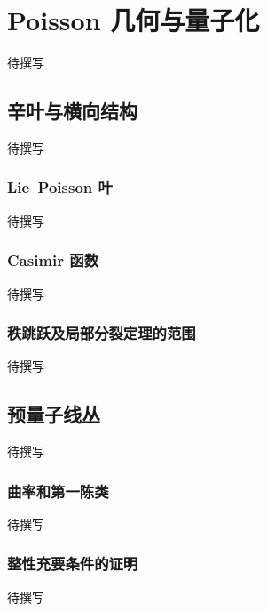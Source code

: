 
% 
% 
% 
% 
% 
% 

\chapter{Poisson 几何与量子化}
\label{g4:app:C}

待撰写

\section{辛叶与横向结构}
\label{g4:sec:C01}
待撰写

\subsection{Lie–Poisson 叶}
\label{g4:subsec:C01:01}
待撰写

\subsection{Casimir 函数}
\label{g4:subsec:C01:02}
待撰写

\subsection{秩跳跃及局部分裂定理的范围}
\label{g4:subsec:C01:03}
待撰写

\section{预量子线丛}
\label{g4:sec:C02}
待撰写

\subsection{曲率和第一陈类}
\label{g4:subsec:C02:01}
待撰写

\subsection{整性充要条件的证明}
\label{g4:subsec:C02:02}
待撰写

